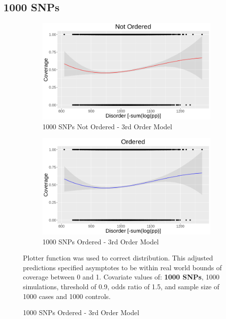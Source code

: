 \subsection{1000 SNPs}
\begin{figure}[H]
    \begin{centering}
    \caption {Coverage and Disorder 1000 SNPs}    \begin{subfigure}[H]{\textwidth}
        \centering
        \includegraphics[width=\textwidth]{images/Coverage_and_Disorder_Charts/1000SNPs_3rdOrder_NotOrd.png}
        \caption{1000 SNPs Not Ordered - 3rd Order Model}
        \label{}
    \end{subfigure}
    \hfill
    
    
    \begin{subfigure}[H]{\textwidth}
        \centering
        \includegraphics[width=\textwidth]{images/Coverage_and_Disorder_Charts/1000SNPs_3rdOrder_Ord.png}
        \caption{1000 SNPs  Ordered - 3rd Order Model}
        \label{}
    \end{subfigure}
    \label{}
\footnotesize
Plotter function was used to correct distribution. This adjusted predictions specified asymptotes to be within real world bounds of coverage between 0 and 1. Covariate values of: \textbf{1000 SNPs}, 1000 simulations, threshold of 0.9, odds ratio of 1.5, and sample size of 1000 cases and 1000 controls.
\end{centering}
\end{figure}

